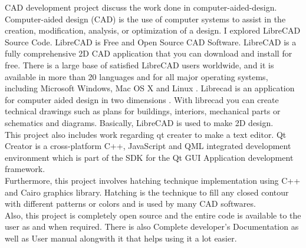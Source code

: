 \begin{Large}
\end{Large}

CAD development project discuss the work done in computer-aided-design. Computer-aided design (CAD) is the use of computer systems to assist in the creation, modification, analysis, or optimization of a design. I explored  LibreCAD  Source  Code. LibreCAD is Free and Open Source CAD Software. LibreCAD is a  fully  comprehensive  2D  CAD   application  that  you  can  download  and  install  for  free.  There  is  a  large base  of  satisfied  LibreCAD   users  worldwide,  and  it  is  available  in  more  than  20  languages  and  for  all
major  operating  systems,  including  Microsoft  Windows,  Mac  OS  X  and  Linux .  Librecad  is  an  application  for  computer  aided  design  in  two dimensions  .  With  librecad   you   can  create  technical  drawings  such  as  plans  for  buildings,  interiors,
mechanical parts or schematics and diagrams. Basically, LibreCAD is used to make 2D design. \\

This project also includes work regarding qt creater to make a text editor. Qt Creator is a cross-platform C++, JavaScript and QML integrated development environment which is part of the SDK for the Qt GUI Application development framework.\\ 

Furthermore, this project involves hatching technique implementation using C++ and Cairo graphics library. Hatching is the technique to fill any closed contour with different patterns or colors and is used by many CAD softwares.\\

Also, this project is completely open source and the entire code is available 
to the user as and when required. There is also Complete developer's 
Documentation as well as User manual alongwith it that helps using it a lot easier.